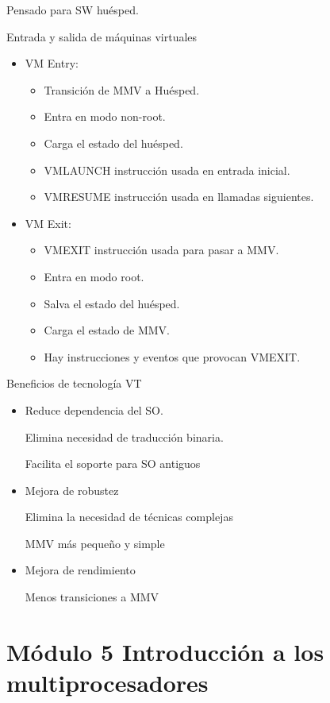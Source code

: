 \documentclass[12pt, twoside, openright]{report} %
\begin{document}
\begin{itemize}
\begin{itemize}
Pensado para SW huésped.
\end{itemize}

Entrada y salida de máquinas virtuales
\begin{itemize}
  \item VM Entry:
  \begin{itemize}
    \item Transición de MMV a Huésped.
    \item Entra en modo non-root.
    \item Carga el estado del huésped.
    \item VMLAUNCH instrucción usada en entrada inicial.
    \item VMRESUME instrucción usada en llamadas siguientes. 
  \end{itemize}
  \item VM Exit:
  \begin{itemize}
    \item VMEXIT instrucción usada para pasar a MMV.
    \item Entra en modo root.
    \item Salva el estado del huésped.
    \item Carga el estado de MMV.
    \item Hay instrucciones y eventos que provocan VMEXIT.
  \end{itemize}

\end{itemize}
\pagebreak
Beneficios de tecnología VT
\begin{itemize}
  \item Reduce dependencia del SO.

Elimina necesidad de traducción binaria.

Facilita el soporte para SO antiguos
  \item Mejora de robustez

Elimina la necesidad de técnicas complejas

MMV más pequeño y simple
  \item Mejora de rendimiento

Menos transiciones a MMV
\end{itemize}


  \end{itemize}

  \chapter{Módulo 5 Introducción a los multiprocesadores}
\end{document}
